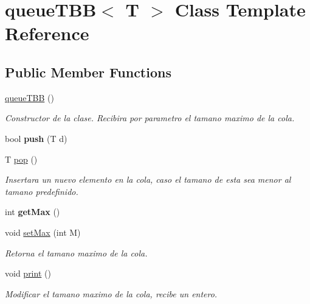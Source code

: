 \hypertarget{classqueueTBB}{
\section{queueTBB$<$ T $>$ Class Template Reference}
\label{classqueueTBB}
}
\subsection*{Public Member Functions}
\begin{DoxyCompactItemize}
\item 
\hypertarget{classqueueTBB_adfe3118e9659f865ef12caedc6f6f159}{
\hyperlink{classqueueTBB_adfe3118e9659f865ef12caedc6f6f159}{queueTBB} ()}
\label{classqueueTBB_adfe3118e9659f865ef12caedc6f6f159}

\begin{DoxyCompactList}\small\item\em Constructor de la clase. Recibira por parametro el tamano maximo de la cola. \item\end{DoxyCompactList}\item 
\hypertarget{classqueueTBB_a63d8146dc8aceab35f72e9a0abfc3560}{
bool {\bfseries push} (T d)}
\label{classqueueTBB_a63d8146dc8aceab35f72e9a0abfc3560}

\item 
\hypertarget{classqueueTBB_a831ad8e7343844ac945ca06732a41e25}{
T \hyperlink{classqueueTBB_a831ad8e7343844ac945ca06732a41e25}{pop} ()}
\label{classqueueTBB_a831ad8e7343844ac945ca06732a41e25}

\begin{DoxyCompactList}\small\item\em Insertara un nuevo elemento en la cola, caso el tamano de esta sea menor al tamano predefinido. \item\end{DoxyCompactList}\item 
\hypertarget{classqueueTBB_adf745520a74dfaea32ed3c7735e9ede6}{
int {\bfseries getMax} ()}
\label{classqueueTBB_adf745520a74dfaea32ed3c7735e9ede6}

\item 
\hypertarget{classqueueTBB_ad2c8e58bc1d87ae397052284307c7a4f}{
void \hyperlink{classqueueTBB_ad2c8e58bc1d87ae397052284307c7a4f}{setMax} (int M)}
\label{classqueueTBB_ad2c8e58bc1d87ae397052284307c7a4f}

\begin{DoxyCompactList}\small\item\em Retorna el tamano maximo de la cola. \item\end{DoxyCompactList}\item 
\hypertarget{classqueueTBB_a941510dd5dc90c56607daffe45147b79}{
void \hyperlink{classqueueTBB_a941510dd5dc90c56607daffe45147b79}{print} ()}
\label{classqueueTBB_a941510dd5dc90c56607daffe45147b79}

\begin{DoxyCompactList}\small\item\em Modificar el tamano maximo de la cola, recibe un entero. \item\end{DoxyCompactList}\end{DoxyCompactItemize}

